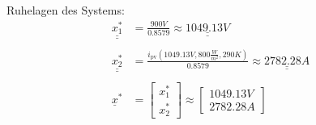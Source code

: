 \newline
Ruhelagen des Systems:
\begin{align}
    \underline{\underline{x_{\mathrm{1}}^*}} &= \frac{900V}{0.8579} \approx \underline{\underline{1049.13V}} \nonumber \\ \nonumber \\
    \underline{\underline{x_{\mathrm{2}}^*}} &= \frac{i_{\mathrm{pv}}(1049.13V, 800\frac{W}{m^2}, 290K)}{0.8579} \approx\underline{\underline{2782.28A}} \nonumber \\ \nonumber \\
    \underline{x}^* &= 
    \begin{bmatrix}
        x_{\mathrm{1}}^* \\
        x_{\mathrm{2}}^*
    \end{bmatrix} \approx
    \begin{bmatrix}
        1049.13V \\
        2782.28A
    \end{bmatrix}
    \label{eq:Gleichung11}
\end{align}

